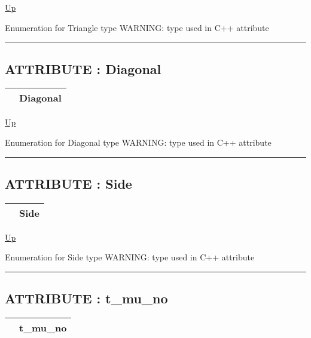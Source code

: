 \hyperlink{ecldoc:PBblas.Types}{Up}

\par
Enumeration for Triangle type WARNING: type used in C++ attribute


\rule{\textwidth}{0.4pt}
\subsection*{ATTRIBUTE : Diagonal}
\hypertarget{ecldoc:ecldoc-Diagonal}{}

{\renewcommand{\arraystretch}{1.5}
\begin{tabularx}{\textwidth}{|>{\raggedright\arraybackslash}l|X|}
\hline
\hspace{0pt} & Diagonal \\
\hline
\end{tabularx}
}

\hyperlink{ecldoc:PBblas.Types}{Up}

\par
Enumeration for Diagonal type WARNING: type used in C++ attribute


\rule{\textwidth}{0.4pt}
\subsection*{ATTRIBUTE : Side}
\hypertarget{ecldoc:ecldoc-Side}{}

{\renewcommand{\arraystretch}{1.5}
\begin{tabularx}{\textwidth}{|>{\raggedright\arraybackslash}l|X|}
\hline
\hspace{0pt} & Side \\
\hline
\end{tabularx}
}

\hyperlink{ecldoc:PBblas.Types}{Up}

\par
Enumeration for Side type WARNING: type used in C++ attribute


\rule{\textwidth}{0.4pt}
\subsection*{ATTRIBUTE : t\_mu\_no}
\hypertarget{ecldoc:pbblas.types.t_mu_no}{}

{\renewcommand{\arraystretch}{1.5}
\begin{tabularx}{\textwidth}{|>{\raggedright\arraybackslash}l|X|}
\hline
\hspace{0pt} & t\_mu\_no \\
\hline
\end{tabularx}
}

